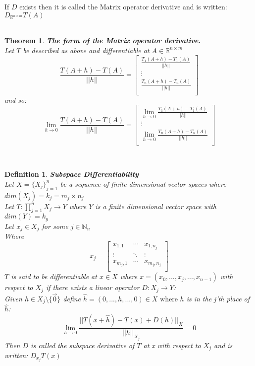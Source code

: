 \documentclass[12pt]{extarticle}
\theoremstyle{plain}
\newtheorem{thm}{Theorem}[section]
\theoremstyle{plain}
\theoremstyle{plain}
\theoremstyle{Definition}
\newtheorem{def.}{Definition}[section]
\theoremstyle{Definition}
\theoremstyle{plain}
\newcommand{\cut}[0]{\noindent\framebox[\linewidth]{\rule{\linewidth}{2pt}}\\}
\begin{document}
If $D$ exists then it is called the Matrix operator derivative and is written: $D_{\mathbb{R}^{n \times m}}T(A)$ \\ 
\cut
\begin{thm} \textbf{The form of the Matrix operator derivative.} \\ 
	Let $T$ be described as above and differentiable at $A \in \mathbb{R}^{n \times m}$ \\ 
	\[
	\frac{T(A + h) - T(A)}{||h||} = 
	\begin{bmatrix}
	\frac{T_1(A + h) - T_1(A)}{||h||} \\ 
	\vdots \\ 
	\frac{T_n(A + h) - T_n(A)}{||h||} \\ 	
	\end{bmatrix}
	\]
	and so: \\ 
	\[
	\lim_{h \to 0} \frac{T(A + h) - T(A)}{||h||} = 
	\begin{bmatrix}
	\lim_{h \to 0} \frac{T_1(A + h) - T_1(A)}{||h||} \\ 
	\vdots \\ 
	\lim_{h \to 0} \frac{T_n(A + h) - T_n(A)}{||h||} \\ 	
	\end{bmatrix}
	\]	
\end{thm}
\cut
\newpage
\begin{def.} \textbf{Subspace Differentiability} \\ 
	Let $X = \{X_j\}_{j=1}^{n}$ be a sequence of finite dimensional vector spaces where $dim(X_j) = k_j = m_j \times n_j$ \\ 
	Let $T : \prod_{j=1}^{n} X_j \to Y$ where $Y$ is a finite dimensional vector space with $dim(Y) = k_y$ \\ 
	Let $x_j \in X_j$ for some $j \in \mathbb{N}_n$ \\ 
	Where 
	\[
	x_j = 
	\begin{bmatrix}
	x_{1,1} & \cdots & x_{1,n_j} \\ 
	\vdots & \ddots & \vdots \\
	x_{m_j,1} & \cdots & x_{m_j,n_j} \\ 	
	\end{bmatrix}
	\]
	$T$ is said to be differentiable at $x \in X$ where $x = (x_0,...,x_j,...,x_{n-1})$ with respect to $X_j$ if there exists a linear operator $D : X_j \to Y$: \\ 
	Given $h \in X_j \setminus \{\vec{0}\}$ define $\hat{h} = (0,...,h,...,0) \in X \text{ where } h$ is in the j'th place of $\hat{h}$: \\
	$$\lim_{h \to 0} \frac{||T(x + \hat{h}) - T(x) + D(h)||_{X}}{||h||_{X_j}} = 0$$
	Then $D$ is called the subspace derivative of $T$ at x with respect to $X_j$ and is written: $D_{x_j} T(x)$ \\ 
\end{def.}
\cut
\end{document}
